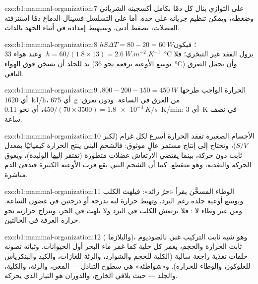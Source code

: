 \begin{solution}{exo:b1:mammal-organization:7}
على التوازي ينال كل  دمًا بكامل أكسجينه الشرياني وضغطه، ويمكن
تنظيم جريانه على حدة. أما على التسلسل فسينال الدماغ دمًا استنزفته
العضلات، بضغط أدنى، وسيهبط إمداده في أثناء الجهد بالذات.
\end{solution}

\begin{solution}{exo:b1:mammal-organization:8}
$hS\Delta T = 80 - 20 = \qty{60}{W}$؛ فيكون
$h = 60/(1.8\times 13) =
\qty{2.6}{W.m^{-2}.K^{-1}}$. وعند هواء
\qty{33}{\celsius} يزول الفقد غير التبخري؛ فلا بد للجلد أن يسخن فوق
الهواء (توسع الأوعية يرفعه نحو \qty{36}{\celsius}) وأن يحمل التعرق
الباقي.
\end{solution}

\begin{solution}{exo:b1:mammal-organization:9}
الحرارة الواجب طرحها $800 - 200 - 150 = \qty{450}{W}$، أي
\qty{1620}{kJ/h}، أي \qty{675}{g} من العرق في الساعة. ودون تعرق:
$450/(70\times 3500) =
\qty{1.8e-3}{K/s}$، أي نحو \qty{0.11}{K/min}:
أي \qty{3}{K} في نصف ساعة.
\end{solution}

\begin{solution}{exo:b1:mammal-organization:10}
الأجسام الصغيرة تفقد الحرارة أسرع لكل غرام (لكبر $S/V$)، وتحتاج إلى
إنتاج مستمر عالٍ موثوق: فالشحم البني ينتج الحرارة كيميائيًا بمعدل
ثابت دون حركة، بينما يقتضي الارتعاش عضلات متطورة (تفتقر إليها
الوليدة)، ويعوق الحركة والتغذية، وهو متقطع. كما أن الشحم البني يقع
قرب الأوعية الكبيرة فيدفئ الدم مباشرة.
\end{solution}

\begin{solution}{exo:b1:mammal-organization:11}
الوطاء المسخَّن يقرأ «حرّ زائد»: فيلهث الكلب ويوسع أوعية جلده رغم
البرد، وتهبط حرارة لبه بدرجة أو درجتين في غضون الساعة. ومن غير وطاء
لا : فلا يرتعش الكلب في البرد ولا يلهث في الحر، وتنزاح
حرارته نحو حرارة الغرفة في الحالتين.
\end{solution}

\begin{solution}{exo:b1:mammal-organization:12}
 ( والبلازما)، وهو شبه ثابت التركيب
غني بالصوديوم ثابت الحرارة والحجم، يغمر كل خلية كما غمر ماء البحر
أول الحيوانات. وثباته تصونه حلقات تغذية راجعة سالبة (الكلية للحجم
والشوارد، والرئة للغازات، والكبد والبنكرياس للغلوكوز، والوطاء
للحرارة). و«شواطئه» هي سطوح التبادل --- المعي، والرئة، والكلية،
والجلد --- حيث يلاقي الخارج، والدوران هو التيار الذي يحركه.
\end{solution}

